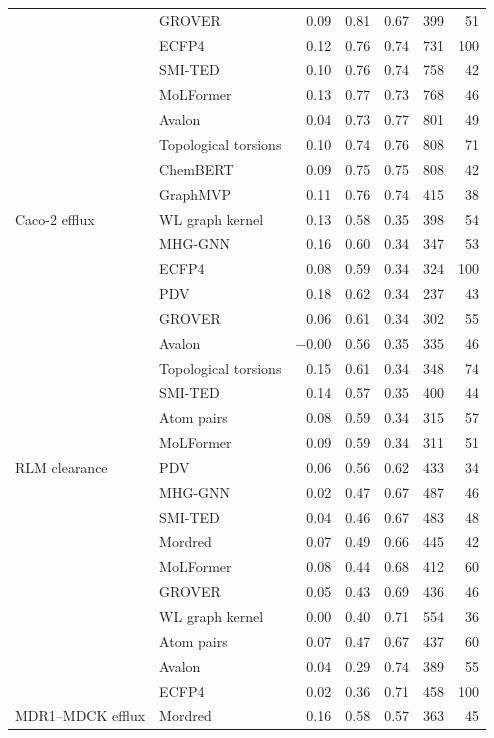 {\begin{longtable}{llrrrrr}
 & GROVER & 0.09 & 0.81 & 0.67 & 399 & 51 \\
 & ECFP4 & 0.12 & 0.76 & 0.74 & 731 & 100 \\
 & SMI-TED & 0.10 & 0.76 & 0.74 & 758 & 42 \\
 & MoLFormer & 0.13 & 0.77 & 0.73 & 768 & 46 \\
 & Avalon & 0.04 & 0.73 & 0.77 & 801 & 49 \\
 & Topological torsions & 0.10 & 0.74 & 0.76 & 808 & 71 \\
 & ChemBERT & 0.09 & 0.75 & 0.75 & 808 & 42 \\
 & GraphMVP & 0.11 & 0.76 & 0.74 & 415 & 38 \\
\midrule
Caco-2 efflux & WL graph kernel & 0.13 & 0.58 & 0.35 & 398 & 54 \\
 & MHG-GNN & 0.16 & 0.60 & 0.34 & 347 & 53 \\
 & ECFP4 & 0.08 & 0.59 & 0.34 & 324 & 100 \\
 & PDV & 0.18 & 0.62 & 0.34 & 237 & 43 \\
 & GROVER & 0.06 & 0.61 & 0.34 & 302 & 55 \\
 & Avalon & $-0.00$ & 0.56 & 0.35 & 335 & 46 \\
 & Topological torsions & 0.15 & 0.61 & 0.34 & 348 & 74 \\
 & SMI-TED & 0.14 & 0.57 & 0.35 & 400 & 44 \\
 & Atom pairs & 0.08 & 0.59 & 0.34 & 315 & 57 \\
 & MoLFormer & 0.09 & 0.59 & 0.34 & 311 & 51 \\
\midrule
RLM clearance & PDV & 0.06 & 0.56 & 0.62 & 433 & 34 \\
 & MHG-GNN & 0.02 & 0.47 & 0.67 & 487 & 46 \\
 & SMI-TED & 0.04 & 0.46 & 0.67 & 483 & 48 \\
 & Mordred & 0.07 & 0.49 & 0.66 & 445 & 42 \\
 & MoLFormer & 0.08 & 0.44 & 0.68 & 412 & 60 \\
 & GROVER & 0.05 & 0.43 & 0.69 & 436 & 46 \\
 & WL graph kernel & 0.00 & 0.40 & 0.71 & 554 & 36 \\
 & Atom pairs & 0.07 & 0.47 & 0.67 & 437 & 60 \\
 & Avalon & 0.04 & 0.29 & 0.74 & 389 & 55 \\
 & ECFP4 & 0.02 & 0.36 & 0.71 & 458 & 100 \\
\midrule
MDR1--MDCK efflux & Mordred & 0.16 & 0.58 & 0.57 & 363 & 45 \\

\end{longtable}}
